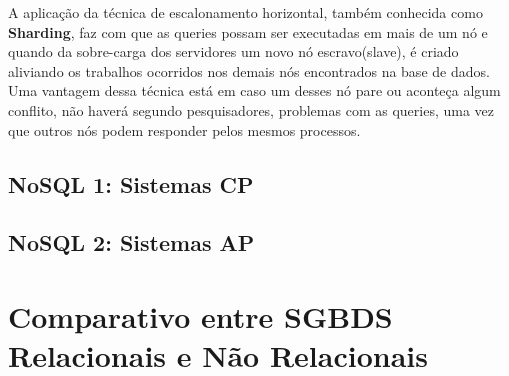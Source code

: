 A aplicação da técnica de escalonamento horizontal, também conhecida como \textbf{Sharding}, faz com que as queries possam ser executadas em mais de um nó e quando da sobre-carga dos servidores um novo nó escravo(slave), é criado aliviando os trabalhos ocorridos nos demais nós encontrados na base de dados. Uma vantagem dessa técnica está em caso um desses nó pare ou aconteça algum
conflito, não haverá segundo pesquisadores, problemas com as queries, uma vez que outros nós podem responder pelos mesmos processos.





\subsection{ NoSQL 1: Sistemas CP }

\subsection{ NoSQL 2: Sistemas AP }

\section{Comparativo entre SGBDS Relacionais e Não Relacionais}
